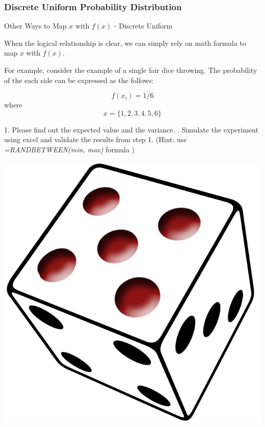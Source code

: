 \documentclass{beamer}
\begin{document}
\subsubsection{Discrete Uniform Probability Distribution}

\begin{frame}{Other Ways to Map $x$ with $f(x)$ - Discrete Uniform}

When the logical relationship is clear, we can simply rely on math formula to map $x$ with $f(x)$. 

\vspace{0.3 cm}
For example, consider the example of a single fair dice throwing. The probability of the each side can be expressed as the follows:

$$f(x_i) =  1/6 $$
where 
$$x = \lbrace 1, 2, 3, 4, 5, 6 \rbrace$$

\vspace{0.3 cm}
1. Please find out the expected value and the variance. 
. Simulate the experiment using excel and validate the results from step 1. (Hint: use \textit{=RANDBETWEEN(min, max)} formula )

\begin{flushright}
\includegraphics[scale=0.1]{images/section4Dice.png}

\end{flushright}
\end{frame}
\end{document}
